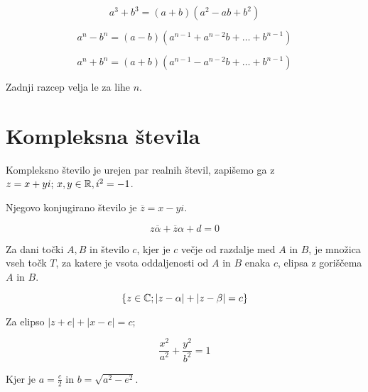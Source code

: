 \[
	a^3 + b^3 = (a+b)(a^2-ab+b^2)
\]

\[
	a^n - b^n = (a-b)(a^{n-1} + a^{n-2}b + \ldots + b^{n-1})
\]

\[
	a^n + b^n = (a+b)(a^{n-1} - a^{n-2}b + \ldots + b^{n-1})
\]

Zadnji razcep velja le za lihe $n$.

\section{Kompleksna števila}


Kompleksno število je urejen par realnih števil, zapišemo ga z $z = x+yi;\, x,y \in \mathbb{R}, i^2 = -1$.

Njegovo konjugirano število je $\overline{z} = x - yi$.


\[
	z \overline{\alpha} + \overline{z} \alpha +d = 0
\]


Za dani točki $A, B$ in število $c$, kjer je $c$ večje od razdalje med $A$ in $B$, je množica vseh točk $T$, za katere je vsota oddaljenosti od $A$ in $B$ enaka $c$, elipsa z goriščema $A$ in $B$.

\[
	\{z \in \mathbb{C}; \left|z-\alpha \right| + \left|z - \beta \right| = c\}
\]


Za elipso $\left|z+e\right| + \left|x-e\right| = c$;

\[
	\frac{x^2}{a^2} + \frac{y^2}{b^2} = 1
\]

Kjer je $a = \frac{c}{2}$ in $b = \sqrt{a^2 - e^2}$.